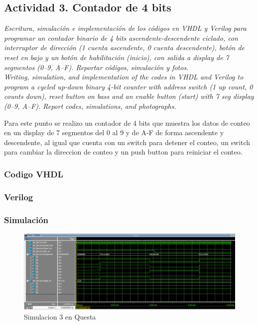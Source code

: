 \subsection*{Actividad 3. Contador de 4 bits}

\textit{\textcolor{Verde}{Escritura, simulación e implementación de los códigos en VHDL y Verilog para programar un contador binario de 4 bits ascendente-descendente ciclado, con interruptor de dirección (1 cuenta ascendente, 0 cuenta descendente), botón de reset en bajo y un botón de habilitación (inicio), con salida a display de 7 segmentos (0--9, A--F). Reportar códigos, simulación y fotos. \\
Writing, simulation, and implementation of the codes in VHDL and Verilog to program a cycled up-down binary 4-bit counter with address switch (1 up count, 0 counts down), reset button on bass and an enable button (start) with 7 seg display (0--9, A--F). Report codes, simulations, and photographs.}}

Para este punto se realizo un contador de 4 bits que muestra los datos de conteo en un display de 7 segmentos del 0 al 9 y de A-F de forma ascendente y descendente, al igual que cuenta con un switch para detener el conteo, un switch para cambiar la direccion de conteo y un push button para reiniciar el conteo. 

\subsubsection*{Codigo VHDL}



\subsubsection*{Verilog}



\subsubsection*{Simulación}


\begin{figure}
    \centering
    \includegraphics[width=1\linewidth]{imagenes/Sim_3.png}
    \caption{Simulacion 3 en Questa}\label{fig:Sim_3}
\end{figure}

